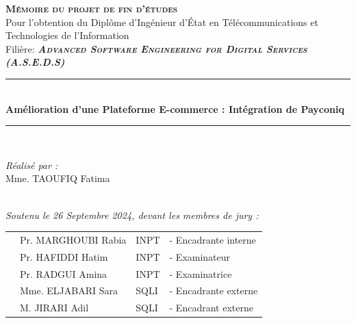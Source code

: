 \vspace{0.4cm}
\begin{center}
{\large \textsc{\textbf{Mémoire du projet de fin d'études}}}\\[0.1cm]
{\large {Pour l’obtention du Diplôme d’Ingénieur d’État en Télécommunications 
et Technologies de l’Information}}\\[0.1cm]
{\large Filière:\textsc{\textit{\textbf{ Advanced Software Engineering for Digital Services (A.S.E.D.S)}}}} \\[0.05cm] 
\vspace{0.4cm}
\vspace{-0.04cm}
\rule{\linewidth}{0.3mm} \\[0.3cm]   %
 { \huge \textbf{Amélioration d'une Plateforme E-commerce : Intégration de Payconiq}} \\[0.15cm] 
\rule{\linewidth}{0.3mm} \\[0.3cm]



\vspace{0.8cm}

\noindent
\begin{minipage}{0.9\textwidth}
    \vspace{-7mm}
  \begin{flushleft} \large
    \emph{Réalisé par :}\\
    Mme. TAOUFIQ Fatima %
  \end{flushleft}
\end{minipage}
\begin{minipage}{0.4\textwidth}

\end{minipage}\\[0.3cm]

{\large \textit{Soutenu le 26 Septembre 2024, devant les membres de jury : }}\\[0.3cm]


\begin{tabular}{p{1cm}lll}
  & \large Pr. MARGHOUBI Rabia & \large INPT & \large - Encadrante interne  \\[0.1cm]
  & \large Pr. HAFIDDI Hatim & \large INPT & \large - Examinateur \\[0.1cm]
  & \large Pr. RADGUI Amina & \large INPT & \large - Examinatrice  \\[0.1cm]
  & \large Mme. ELJABARI Sara & \large SQLI & \large - Encadrante externe  \\[0.1cm]
  & \large M. JIRARI Adil & \large SQLI & \large - Encadrant externe  \\[0.1cm]



\end{tabular}
\end{center}
